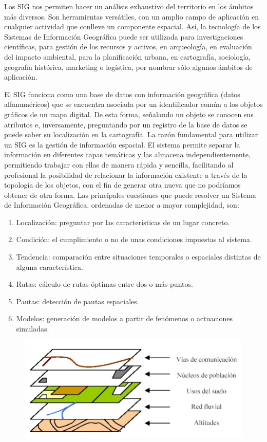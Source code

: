 Los SIG nos permiten hacer un análisis exhaustivo del territorio en los ámbitos más diversos. Son herramientas versátiles, con un amplio campo de aplicación en cualquier actividad que conlleve un componente espacial.
Así, la tecnología de los Sistemas de Información Geográfica puede ser utilizada para investigaciones científicas, para gestión de los recursos y activos, en arqueología, en evaluación del impacto ambiental, para la planificación urbana, en cartografía, sociología, geografía histórica, marketing o logística, por nombrar sólo algunos ámbitos de aplicación.

El SIG funciona como una base de datos con información geográfica (datos alfanuméricos) que se encuentra asociada por un identificador común a los objetos gráficos de un mapa digital. De esta forma, señalando un objeto se conocen sus atributos e, inversamente, preguntando por un registro de la base de datos se puede saber su localización en la cartografía.
La razón fundamental para utilizar un SIG es la gestión de información espacial. El sistema permite separar la información en diferentes capas temáticas y las almacena independientemente, permitiendo trabajar con ellas de manera rápida y sencilla, facilitando al profesional la posibilidad de relacionar la información existente a través de la topología de los objetos, con el fin de generar otra nueva que no podríamos obtener de otra forma.
Las principales cuestiones que puede resolver un Sistema de Información Geográfica, ordenadas de menor a mayor complejidad, son:
\begin{enumerate}
\item Localización: preguntar por las características de un lugar concreto.
\item Condición: el cumplimiento o no de unas condiciones impuestas al sistema.
\item Tendencia: comparación entre situaciones temporales o espaciales distintas de alguna característica.
\item Rutas: cálculo de rutas óptimas entre dos o más puntos.
\item Pautas: detección de pautas espaciales.
\item Modelos: generación de modelos a partir de fenómenos o actuaciones simuladas.
\end{enumerate}

\begin{figure}[htbp]
	\begin{center}
		\includegraphics[width=.4\textwidth]{images/imgmarco/sistemageo}
		\label{fig:sistemageo}
	\end{center}
\end{figure}


